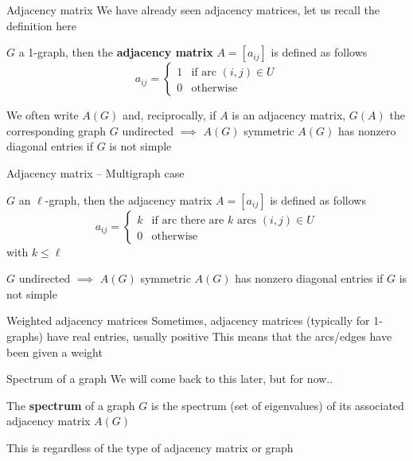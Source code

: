 \documentclass[aspectratio=43]{beamer}
\begin{document}
\begin{frame}{Adjacency matrix}
We have already seen adjacency matrices, let us recall the definition here
\begin{definition}
	$G$ a 1-graph, then the \textbf{adjacency matrix} $A=[a_{ij}]$ is defined as follows
	\[
		a_{ij} = \begin{cases}
			1 & \text{if arc } (i,j)\in U\\
			0 & \text{otherwise}
		\end{cases}
	\]
\end{definition}
\vfill
We often write $A(G)$ and, reciprocally, if $A$ is an adjacency matrix, $G(A)$ the corresponding graph
\vfill
$G$ undirected $\implies$ $A(G)$ symmetric
\vfill
$A(G)$ has nonzero diagonal entries if $G$ is not simple
\end{frame}

\begin{frame}{Adjacency matrix -- Multigraph case}
\begin{definition}
	$G$ an $\ell$-graph, then the adjacency matrix $A=[a_{ij}]$ is defined as follows
	\[
		a_{ij} = \begin{cases}
			k & \text{if arc there are $k$ arcs } (i,j)\in U\\
			0 & \text{otherwise}
		\end{cases}
	\]
	with $k\leq \ell$
\end{definition}
\vfill
$G$ undirected $\implies$ $A(G)$ symmetric
\vfill
$A(G)$ has nonzero diagonal entries if $G$ is not simple
\end{frame}

\begin{frame}{Weighted adjacency matrices}
	Sometimes, adjacency matrices (typically for 1-graphs) have real entries, usually positive
	\vfill
	This means that the arcs/edges have been given a weight
\end{frame}

\begin{frame}{Spectrum of a graph}
	We will come back to this later, but for now..
	\vfill
	\begin{definition}
		The \textbf{spectrum} of a graph $G$ is the spectrum (set of eigenvalues) of its associated adjacency matrix $A(G)$
	\end{definition}
	\vfill
	This is regardless of the type of adjacency matrix or graph
\end{frame}
\end{document}
